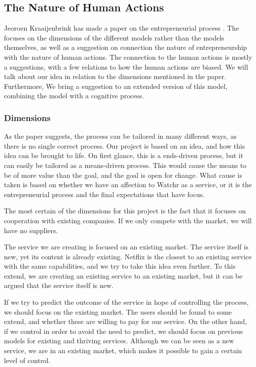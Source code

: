 \subsection{The Nature of Human Actions}
\label{sec:gote}
Jeoroen Kraaijenbrink has made a paper on the entrepreneurial process \cite{kraaijenbrink}. The focuses on the dimensions of the different models rather than the models themselves, as well as a suggestion on connection the nature of entrepreneurship with the nature of human actions. The connection to the human actions is mostly a suggestions, with a few relations to how the human actions are biased. We will talk about our idea in relation to the dimensions mentioned in the paper. Furthermore, We bring a suggestion to an extended version of this model, combining the model with a cognitive process.

\subsubsection*{Dimensions}
As the paper suggests, the process can be tailored in many different ways, as there is no single correct process. Our project is based on an idea, and how this idea can be brought to life. On first glance, this is a ends-driven process, but it can easily be tailored as a means-driven process. This would cause the means to be of more value than the goal, and the goal is open for change. What cause is taken is based on whether we have an affection to Watchr as a service, or it is the entrepreneurial process and the final expectations that have focus.

The most certain of the dimensions for this project is the fact that it focuses on cooperation with existing companies. If we only compete with the market, we will have no suppliers.

The service we are creating is focused on an existing market. The service itself is new, yet its content is already existing. Netflix is the closest to an existing service with the same capabilities, and we try to take this idea even further. To this extend, we are creating an existing service to an existing market, but it can be argued that the service itself is new.

If we try to predict the outcome of the service in hope of controlling the process, we should focus on the existing market. The users should be found to some extend, and whether these are willing to pay for our service. On the other hand, if we control in order to avoid the need to predict, we should focus on previous models for existing and thriving services. Although we can be seen as a new service, we are in an existing market, which makes it possible to gain a certain level of control.

